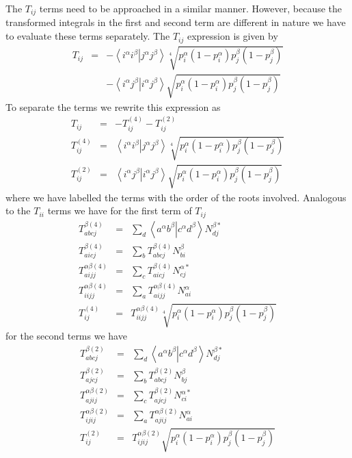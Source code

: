 \documentclass[pra]{revtex4-1}
\newcommand{\eria}[4]{\left\langle #1^\alpha #2^\beta \right.\left| #3^\alpha #4^\beta \right\rangle}
\begin{document}
The $T_{ij}$ terms need to be approached in a similar manner. However, because the
transformed integrals in the first and second term are different in nature we have
to evaluate these terms separately. 
The $T_{ij}$ expression is given by
\begin{eqnarray}
   T_{ij} &=&  -\eria{i}{i}{j}{j} \sqrt[4]{p_i^\alpha(1-p_i^\alpha) p_j^\beta(1-p_j^\beta)} \nonumber \\
          &&   -\eria{i}{j}{i}{j} \sqrt{p_i^\alpha(1-p_i^\alpha) p_j^\beta(1-p_j^\beta)}
\end{eqnarray}
To separate the terms we rewrite this expression as
\begin{eqnarray}
   T_{ij}       &=& -T_{ij}^{(4)} - T_{ij}^{(2)} \\
   T_{ij}^{(4)} &=& \eria{i}{i}{j}{j} \sqrt[4]{p_i^\alpha(1-p_i^\alpha) p_j^\beta(1-p_j^\beta)} \\
   T_{ij}^{(2)} &=& \eria{i}{j}{i}{j} \sqrt{p_i^\alpha(1-p_i^\alpha) p_j^\beta(1-p_j^\beta)}
\end{eqnarray}
where we have labelled the terms with the order of the roots involved. 
Analogous to the $T_{ii}$ terms we have for the first term of $T_{ij}$
\begin{eqnarray}
  T_{abcj}^{\beta(4)}       &=& \sum_d \eria{a}{b}{c}{d}   N_{dj}^{\beta *} \\
  T_{aicj}^{\beta(4)}       &=& \sum_b T_{abcj}^{\beta(4)} N_{bi}^{\beta} \\
  T_{aijj}^{\alpha\beta(4)} &=& \sum_c T_{aicj}^{\beta(4)} N_{cj}^{\alpha *} \\
  T_{iijj}^{\alpha\beta(4)} &=& \sum_a T_{aijj}^{\alpha\beta(4)} N_{ai}^{\alpha} \\
  T_{ij}^{(4)}              &=& T_{iijj}^{\alpha\beta(4)}
                                \sqrt[4]{p_i^\alpha(1-p_i^\alpha) p_j^\beta(1-p_j^\beta)}
\end{eqnarray}
for the second terms we have
\begin{eqnarray}
  T_{abcj}^{\beta(2)}       &=& \sum_d \eria{a}{b}{c}{d}   N_{dj}^{\beta *} \\
  T_{ajcj}^{\beta(2)}       &=& \sum_b T_{abcj}^{\beta(2)} N_{bj}^{\beta} \\
  T_{ajij}^{\alpha\beta(2)} &=& \sum_c T_{ajcj}^{\beta(2)} N_{ci}^{\alpha *} \\
  T_{ijij}^{\alpha\beta(2)} &=& \sum_a T_{ajij}^{\alpha\beta(2)} N_{ai}^{\alpha} \\
  T_{ij}^{(2)}              &=& T_{ijij}^{\alpha\beta(2)}
                                \sqrt{p_i^\alpha(1-p_i^\alpha) p_j^\beta(1-p_j^\beta)}
\end{eqnarray}
\end{document}

